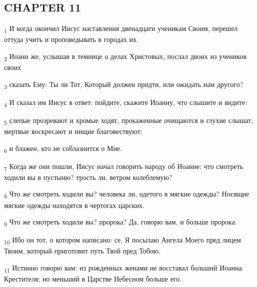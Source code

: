\subsection{CHAPTER 11}
\begin{tcolorbox}
\textsubscript{1} И когда окончил Иисус наставления двенадцати ученикам Своим, перешел оттуда учить и проповедывать в городах их.
\end{tcolorbox}
\begin{tcolorbox}
\textsubscript{2} Иоанн же, услышав в темнице о делах Христовых, послал двоих из учеников своих
\end{tcolorbox}
\begin{tcolorbox}
\textsubscript{3} сказать Ему: Ты ли Тот, Который должен придти, или ожидать нам другого?
\end{tcolorbox}
\begin{tcolorbox}
\textsubscript{4} И сказал им Иисус в ответ: пойдите, скажите Иоанну, что слышите и видите:
\end{tcolorbox}
\begin{tcolorbox}
\textsubscript{5} слепые прозревают и хромые ходят, прокаженные очищаются и глухие слышат, мертвые воскресают и нищие благовествуют;
\end{tcolorbox}
\begin{tcolorbox}
\textsubscript{6} и блажен, кто не соблазнится о Мне.
\end{tcolorbox}
\begin{tcolorbox}
\textsubscript{7} Когда же они пошли, Иисус начал говорить народу об Иоанне: что смотреть ходили вы в пустыню? трость ли, ветром колеблемую?
\end{tcolorbox}
\begin{tcolorbox}
\textsubscript{8} Что же смотреть ходили вы? человека ли, одетого в мягкие одежды? Носящие мягкие одежды находятся в чертогах царских.
\end{tcolorbox}
\begin{tcolorbox}
\textsubscript{9} Что же смотреть ходили вы? пророка? Да, говорю вам, и больше пророка.
\end{tcolorbox}
\begin{tcolorbox}
\textsubscript{10} Ибо он тот, о котором написано: се, Я посылаю Ангела Моего пред лицем Твоим, который приготовит путь Твой пред Тобою.
\end{tcolorbox}
\begin{tcolorbox}
\textsubscript{11} Истинно говорю вам: из рожденных женами не восставал больший Иоанна Крестителя; но меньший в Царстве Небесном больше его.
\end{tcolorbox}
